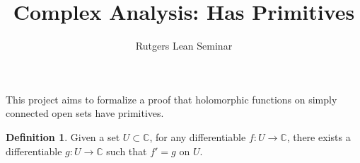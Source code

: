 \documentclass{report}
\title{Complex Analysis: Has Primitives}
\author{Rutgers Lean Seminar}
\theoremstyle{definition}
\newtheorem{definition}{Definition}
\begin{document}
\maketitle

This project aims to formalize a proof that holomorphic functions on simply connected open sets have primitives.

\begin{definition}
  \label{def:has_primitives}
  Given a set $U\subset\mathbb C$, for any differentiable $f:U\to\mathbb C$, there exists a differentiable $g:U\to\mathbb C$ such that $f'=g$ on $U$.
\end{definition}
\end{document}

